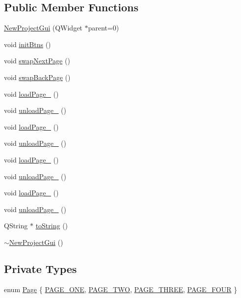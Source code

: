 \subsection*{Public Member Functions}
\begin{DoxyCompactItemize}
\item 
\hyperlink{class_new_project_gui_a477f5d0a5d466be598b3bdf55d22b7f1}{New\-Project\-Gui} (Q\-Widget $\ast$parent=0)
\item 
void \hyperlink{class_new_project_gui_a5822d7472aff8da63b822e09afa481e1}{init\-Btns} ()
\item 
void \hyperlink{class_new_project_gui_ae56f35367fded2e1d303312cbc0549e1}{swap\-Next\-Page} ()
\item 
void \hyperlink{class_new_project_gui_ac04edf99653bbc5881e3cba6b385e967}{swap\-Back\-Page} ()
\item 
void \hyperlink{class_new_project_gui_a71cc5704a7e11e7344cf2cbb04f44097}{load\-Page\-\_} ()
\item 
void \hyperlink{class_new_project_gui_a09eaf9bcd77d5625a47b34113c87ac91}{unload\-Page\-\_} ()
\item 
void \hyperlink{class_new_project_gui_ac81882c81a3315a48634fa0f2a84f6a5}{load\-Page\-\_} ()
\item 
void \hyperlink{class_new_project_gui_a34be4c9396d11e877fab6da78edba5a8}{unload\-Page\-\_} ()
\item 
void \hyperlink{class_new_project_gui_afe4d4300c0272c14069daf81a6d2f47f}{load\-Page\-\_} ()
\item 
void \hyperlink{class_new_project_gui_a1ec5cfd09dfc43a0d4aac473cf215a04}{unload\-Page\-\_} ()
\item 
void \hyperlink{class_new_project_gui_a92027285ea0ec685ebef5b62afb4e4eb}{load\-Page\-\_} ()
\item 
void \hyperlink{class_new_project_gui_a251eaaea1f985069babb7a203de852db}{unload\-Page\-\_} ()
\item 
Q\-String $\ast$ \hyperlink{class_new_project_gui_a06d242dd2c162f66284bf468e17c5c73}{to\-String} ()
\item 
\hyperlink{class_new_project_gui_a2057fcc82bc632a4c7c506274dd45fe1}{$\sim$\-New\-Project\-Gui} ()
\end{DoxyCompactItemize}
\subsection*{Private Types}
\begin{DoxyCompactItemize}
\item 
enum \hyperlink{class_new_project_gui_a7dd25d019611ddc0fd2b357e0f3a446c}{Page} \{ \hyperlink{class_new_project_gui_a7dd25d019611ddc0fd2b357e0f3a446ca395ebc3cb6570b4ccb4c2909346117f2}{P\-A\-G\-E\-\_\-\-O\-N\-E}, 
\hyperlink{class_new_project_gui_a7dd25d019611ddc0fd2b357e0f3a446ca1e6736f0205ad831d43236b4f1caaf36}{P\-A\-G\-E\-\_\-\-T\-W\-O}, 
\hyperlink{class_new_project_gui_a7dd25d019611ddc0fd2b357e0f3a446ca04d537b5c5c745eb5ded027596826e5f}{P\-A\-G\-E\-\_\-\-T\-H\-R\-E\-E}, 
\hyperlink{class_new_project_gui_a7dd25d019611ddc0fd2b357e0f3a446ca30dbd5f0bc435ce807a2d71ce1458322}{P\-A\-G\-E\-\_\-\-F\-O\-U\-R}
 \}
\end{DoxyCompactItemize}
